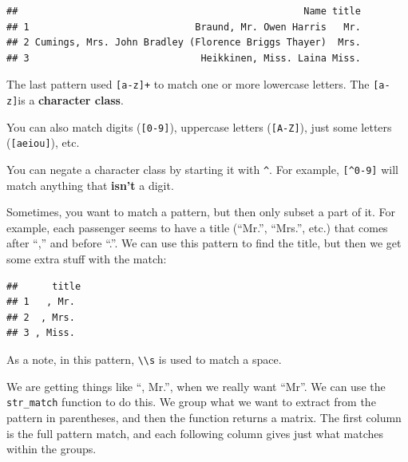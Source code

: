\documentclass[]{book}
\makeatletter
\newenvironment{Shaded}{\begin{snugshade}}{\end{snugshade}}
\newcommand{\KeywordTok}[1]{\textcolor[rgb]{0.13,0.29,0.53}{\textbf{{#1}}}}
\newcommand{\DataTypeTok}[1]{\textcolor[rgb]{0.13,0.29,0.53}{{#1}}}
\newcommand{\DecValTok}[1]{\textcolor[rgb]{0.00,0.00,0.81}{{#1}}}
\newcommand{\CharTok}[1]{\textcolor[rgb]{0.31,0.60,0.02}{{#1}}}
\newcommand{\StringTok}[1]{\textcolor[rgb]{0.31,0.60,0.02}{{#1}}}
\newcommand{\NormalTok}[1]{{#1}}
\newenvironment{kframe}{%
\medskip{}
\setlength{\fboxsep}{.8em}
 \def\at@end@of@kframe{}%
 \ifinner\ifhmode%
  \def\at@end@of@kframe{\end{minipage}}%
  \begin{minipage}{\columnwidth}%
 \fi\fi%
 \def\FrameCommand##1{\hskip\@totalleftmargin \hskip-\fboxsep
 \colorbox{shadecolor}{##1}\hskip-\fboxsep
     \hskip-\linewidth \hskip-\@totalleftmargin \hskip\columnwidth}%
 \MakeFramed {\advance\hsize-\width
   \@totalleftmargin\z@ \linewidth\hsize
   \@setminipage}}%
 {\par\unskip\endMakeFramed%
 \at@end@of@kframe}
\renewenvironment{Shaded}{\begin{kframe}}{\end{kframe}}
\makeatother
\begin{document}
\begin{verbatim}
##                                                  Name title
## 1                             Braund, Mr. Owen Harris   Mr.
## 2 Cumings, Mrs. John Bradley (Florence Briggs Thayer)  Mrs.
## 3                              Heikkinen, Miss. Laina Miss.
\end{verbatim}

The last pattern used \texttt{{[}a-z{]}+} to match one or more lowercase
letters. The \texttt{{[}a-z{]}}is a \textbf{character class}. \bigskip 

You can also match digits (\texttt{{[}0-9{]}}), uppercase letters
(\texttt{{[}A-Z{]}}), just some letters (\texttt{{[}aeiou{]}}), etc.
\bigskip

You can negate a character class by starting it with \texttt{\^{}}. For
example, \texttt{{[}\^{}0-9{]}} will match anything that \textbf{isn't}
a digit.

Sometimes, you want to match a pattern, but then only subset a part of
it. For example, each passenger seems to have a title (``Mr.'',
``Mrs.'', etc.) that comes after ``,'' and before ``.''. We can use this
pattern to find the title, but then we get some extra stuff with the
match:

\begin{Shaded}
\end{Shaded}

\begin{verbatim}
##      title
## 1   , Mr. 
## 2  , Mrs. 
## 3 , Miss.
\end{verbatim}

As a note, in this pattern, \texttt{\textbackslash{}\textbackslash{}s}
is used to match a space.

We are getting things like ``, Mr.'', when we really want ``Mr''. We can
use the \texttt{str\_match} function to do this. We group what we want
to extract from the pattern in parentheses, and then the function
returns a matrix. The first column is the full pattern match, and each
following column gives just what matches within the groups.
\end{document}
